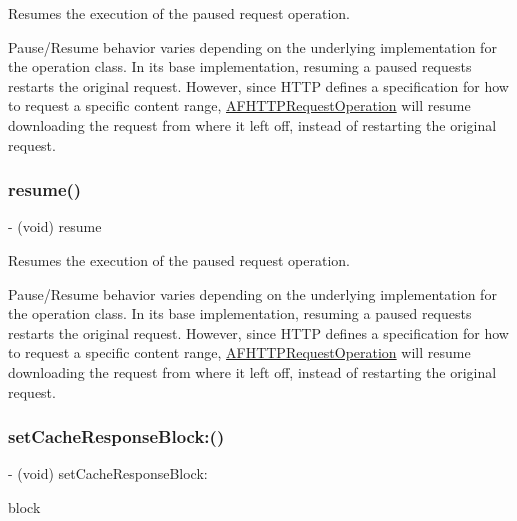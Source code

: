 Resumes the execution of the paused request operation.

Pause/\+Resume behavior varies depending on the underlying implementation for the operation class. In its base implementation, resuming a paused requests restarts the original request. However, since H\+T\+TP defines a specification for how to request a specific content range, {\ttfamily \mbox{\hyperlink{interface_a_f_h_t_t_p_request_operation}{A\+F\+H\+T\+T\+P\+Request\+Operation}}} will resume downloading the request from where it left off, instead of restarting the original request. \mbox{\label{interface_a_f_u_r_l_connection_operation_ae67c1478ba17af4426ca7152251da473}} 
\subsubsection{\texorpdfstring{resume()}{resume()}\hspace{0.1cm}{\footnotesize\ttfamily [3/3]}}
{\footnotesize\ttfamily -\/ (void) resume \begin{DoxyParamCaption}{ }\end{DoxyParamCaption}}

Resumes the execution of the paused request operation.

Pause/\+Resume behavior varies depending on the underlying implementation for the operation class. In its base implementation, resuming a paused requests restarts the original request. However, since H\+T\+TP defines a specification for how to request a specific content range, {\ttfamily \mbox{\hyperlink{interface_a_f_h_t_t_p_request_operation}{A\+F\+H\+T\+T\+P\+Request\+Operation}}} will resume downloading the request from where it left off, instead of restarting the original request. \mbox{\label{interface_a_f_u_r_l_connection_operation_a1de158a5fe7e2e45c6fc901a59870b28}} 
\subsubsection{\texorpdfstring{set\+Cache\+Response\+Block\+:()}{setCacheResponseBlock:()}\hspace{0.1cm}{\footnotesize\ttfamily [1/3]}}
{\footnotesize\ttfamily -\/ (void) set\+Cache\+Response\+Block\+: \begin{DoxyParamCaption}\item[{(nullable N\+S\+Cached\+U\+R\+L\+Response $\ast$($^\wedge$)(N\+S\+U\+R\+L\+Connection $\ast$connection, N\+S\+Cached\+U\+R\+L\+Response $\ast$cached\+Response))}]{block }\end{DoxyParamCaption}}

